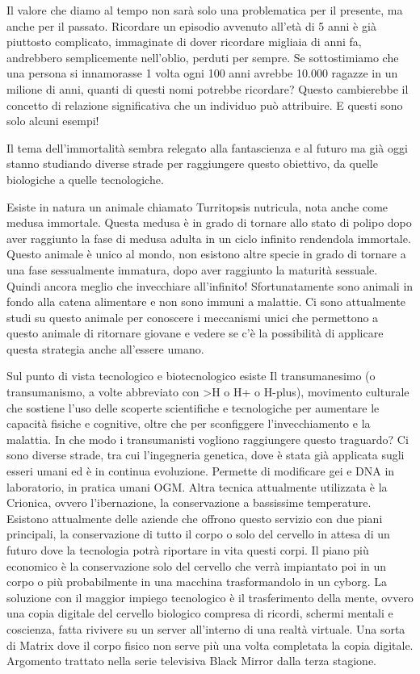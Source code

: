 \documentclass[12pt]{book} %
\begin{document}
Il valore che diamo al tempo non sarà solo una problematica per il presente, ma anche per il passato. Ricordare un
episodio avvenuto all'età di 5 anni è già piuttosto complicato, immaginate di dover ricordare
migliaia di anni fa, andrebbero semplicemente nell'oblio, perduti per sempre. Se sottostimiamo che
una persona si innamorasse 1 volta ogni 100 anni avrebbe 10.000 ragazze in un milione di anni, quanti di questi nomi
potrebbe ricordare? Questo cambierebbe il concetto di relazione significativa che un individuo può attribuire. E questi
sono solo alcuni esempi!

Il tema dell'immortalità sembra relegato alla fantascienza e al futuro ma già oggi stanno studiando
diverse strade per raggiungere questo obiettivo, da quelle biologiche a quelle tecnologiche. 

Esiste in natura un animale chiamato Turritopsis nutricula, nota anche come medusa immortale. Questa medusa è in grado
di tornare allo stato di polipo dopo aver raggiunto la fase di medusa adulta in un ciclo infinito rendendola immortale.
Questo animale è unico al mondo, non esistono altre specie in grado di tornare a una fase sessualmente immatura, dopo
aver raggiunto la maturità sessuale. Quindi ancora meglio che invecchiare all'infinito!
Sfortunatamente sono animali in fondo alla catena alimentare e non sono immuni a malattie. Ci sono attualmente studi su
questo animale per conoscere i meccanismi unici che permettono a questo animale di ritornare giovane e vedere se
c'è la possibilità di applicare questa strategia anche all'essere umano.

Sul punto di vista tecnologico e biotecnologico esiste Il transumanesimo (o transumanismo, a volte abbreviato con
{\textgreater}H o H+ o H-plus), movimento culturale che sostiene l'uso delle scoperte scientifiche e tecnologiche per
aumentare le capacità fisiche e cognitive, oltre che per sconfiggere l'invecchiamento e la
malattia. In che modo i transumanisti vogliono raggiungere questo traguardo? Ci sono diverse strade, tra cui
l'ingegneria genetica, dove è stata già applicata sugli esseri umani ed è in continua evoluzione.
Permette di modificare gei e DNA in laboratorio, in pratica umani OGM. Altra tecnica attualmente utilizzata è la
Crionica, ovvero l'ibernazione, la conservazione a bassissime temperature. Esistono attualmente
delle aziende che offrono questo servizio con due piani principali, la conservazione di tutto il corpo o solo del
cervello in attesa di un futuro dove la tecnologia potrà riportare in vita questi corpi. Il piano più economico è la
conservazione solo del cervello che verrà impiantato poi in un corpo o più probabilmente in una macchina trasformandolo
in un cyborg. La soluzione con il maggior impiego tecnologico è il trasferimento della mente, ovvero una copia digitale
del cervello biologico compresa di ricordi, schermi mentali e coscienza, fatta rivivere su un server
all'interno di una realtà virtuale. Una sorta di Matrix dove il corpo fisico non serve più una
volta completata la copia digitale. Argomento trattato nella serie televisiva Black Mirror dalla terza stagione.
\end{document}
